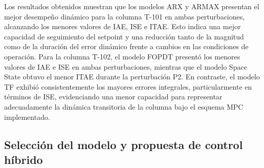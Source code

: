 Los resultados obtenidos muestran que los modelos ARX y ARMAX presentan el mejor desempeño dinámico para la columna T-101 en ambas perturbaciones, alcanzando los menores valores de IAE, ISE e ITAE. Esto indica una mejor capacidad de seguimiento del setpoint y una reducción tanto de la magnitud como de la duración del error dinámico frente a cambios en las condiciones de operación. Para la columna T-102, el modelo FOPDT presentó los menores valores de IAE e ISE en ambas perturbaciones, mientras que el modelo Space State obtuvo el menor ITAE durante la perturbación P2. En contraste, el modelo TF exhibió consistentemente los mayores errores integrales, particularmente en términos de ISE, evidenciando una menor capacidad para representar adecuadamente la dinámica transitoria de la columna bajo el esquema MPC implementado.

\subsection{Selección del modelo y propuesta de control híbrido}

